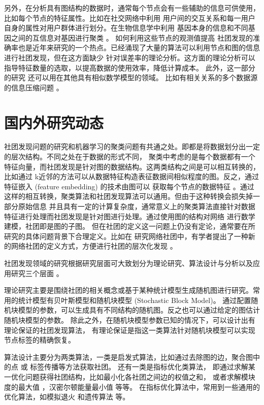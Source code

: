 另外，在分析具有图结构的数据时，通常每个节点会有一些辅助的信息可供使用，比如每个节点的特征属性。比如在社交网络中利用
用户间的交互关系和每一用户自身的属性对用户群体进行划分。在生物信息学中利用
基因本身的信息和不同基因之间的互信息对基因进行聚类 \cite{4359897}。
如何利用这些节点的观测值提高
社团发现的准确率也是近年来研究的一个热点。已经涌现了大量的算法可以利用节点和图的信息进行社团发现，但在这方面缺少
针对误差率的理论分析。这方面的理论分析可以指导特征数量的选取，以提高数据的使用效率，降低计算成本。
此外，这一部分的研究
还可以用在其他具有相似数学模型的领域。
比如有相关关系的多个数据源的信息压缩问题
\cite{abbe17sideinfo}。

\section{国内外研究动态}
社团发现问题的研究和机器学习的聚类问题有共通之处。即都是将数据划分出一定的层次结构。不同之处在于数据的形式不同，
聚类中考虑的是每个数据都有一个特征向量，而社团发现是针对图的数据结构。这两类结构之间是可以相互转换的，比如通过
k近邻的方法可以从数据特征构造表征数据间相似程度的图。反之，通过特征嵌入 (feature embedding) 的技术由图可以
获取每个节点的数据特征 \cite{hamilton2017representation}。通过这样的相互转换，聚类算法和社团发现算法可以通用。但由于这种转换会损失掉一部分原始信息
并且具有一定的计算复杂度，通常意义上的聚类算法直接针对数据特征进行处理而社团发现是针对图进行处理。通过使用图的结构对网络
进行数学建模，社团即是图的子图。
但在社团的定义这一问题上仍没有定论，通常要在所研究的具体问题背景下合理定义。比如在
研究网络社团中，有学者提出了一种新的网络社团的定义方式，方便进行社团的层次化发现
\cite{alphabetaclustering2019}。

社团发现领域的研究根据研究层面可大致划分为理论研究、算法设计与分析以及应用研究三个层面
\cite{ZJSH201102017}。

理论研究主要是围绕社团的相关概念或基于某种统计模型生成随机图进行研究。常用的统计模型有贝叶斯模型和随机块模型 (Stochastic Block Model)。
通过配置随机块模型的参数，可以生成具有不同结构的随机图。反之也可以通过给定的图估计随机块模型的参数\cite{RJXB201609005}。
除此之外，在随机块模型参数已知的情况下，可以设计出有理论保证的社团发现算法，
有理论保证是指这一类算法针对随机块模型可以实现节点标签的精确恢复。

算法设计主要分为两类算法，一类是启发式算法，比如通过去除图的边\cite{girvan2002community}，聚合图中的点 \cite{clauset2004finding}或
标签传播\cite{raghavan2007near}等方法获取社团。
还有一类是指标优化类算法，
即通过求解某一优化问题获得社团结构，比如最小化各社团之间边的权值之和，
或者求解模块度的最大值 \cite{newman2006modularity}，汉密尔顿能量最小值
\cite{PhysRevLett.93.218701} 等等。
在指标优化算法中，常用到一些通用的优化算法，如模拟退火\cite{PhysRevE.71.046101}
和遗传算法 \cite{pizzuti2008ga}等。

